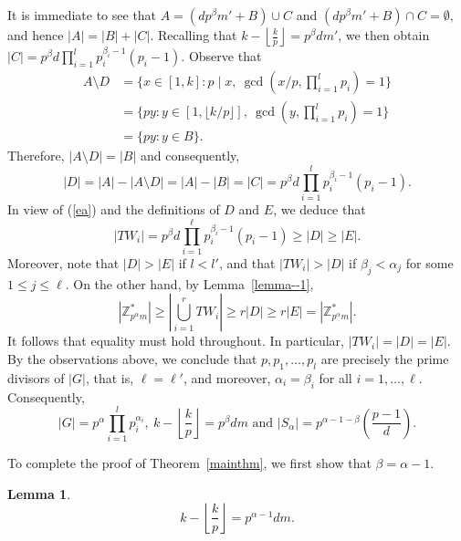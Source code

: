 \documentclass[12pt]{article}
\newtheorem{lemma}[theorem]{Lemma}
\begin{document}
It is immediate to see that $A = (d p^{\beta} m' + B) \cup C$ and $(d p^{\beta} m' + B) \cap C = \emptyset,$
and hence \(|A| = |B| + |C|\).  
Recalling that \(k - \left\lfloor \frac{k}{p} \right\rfloor = p^{\beta} d m'\), we then obtain $|C| = p^{\beta} d \prod_{i=1}^{l} p_i^{\beta_i - 1}(p_i - 1).$ Observe that
\begin{align*}
A \setminus D
&= \{x \in [1,k] : p \mid x,\ \gcd(x/p, \textstyle\prod_{i=1}^{l} p_i) = 1\} \\
&= \{p y : y \in [1,\lfloor k/p \rfloor],\ \gcd(y, \textstyle\prod_{i=1}^{l} p_i) = 1\} \\
&= \{p y : y \in B\}.
\end{align*}
Therefore, $|A \setminus D|=|B|$ and consequently, \[
|D| = |A| - |A \setminus D| = |A| - |B| = |C|
= p^{\beta} d \prod_{i=1}^{l} p_i^{\beta_i - 1}(p_i - 1).
\]
In view of (\ref{ea}) and  the definitions of $D$ and $E$, we deduce that 
\[
|T W_i| =p^{\beta}d \prod_{i=1}^{\ell} p_i^{\beta_i-1}(p_i-1) \ge |D| \ge |E|.
\]
Moreover, note that \( |D|>|E| \) if \(l<l'\), and that $|TW_i|>|D|$  if  $ \beta_j<\alpha_j$ for  some $ 1\leq j\leq \ell$. 
On the other hand, by Lemma~\ref{lemma--1},
\[
|\mathbb{Z}_{p^{\alpha} m}^{*}|
\ge \left| \bigcup_{i=1}^{r} T W_i \right|
\ge r |D|
\ge r |E|=|\mathbb{Z}_{p^{\alpha} m}^{*}|.
\]
It follows that equality must hold throughout. In particular, $|T W_i| = |D| = |E|$. 
By the observations above, we conclude that \(p,p_1,\dots,p_l\) are precisely the prime divisors of \(|G|\), that is, $\ell=\ell'$, and moreover,  
\(\alpha_i = \beta_i\) for all \(i=1,\ldots, \ell\). 
Consequently, \[
|G| = p^{\alpha} \prod_{i=1}^{l} p_i^{\alpha_i},\  k - \left\lfloor \frac{k}{p} \right\rfloor = p^{\beta} d m \mbox{ and } 
|S_\alpha| = p^{\alpha - 1 - \beta} \left(\frac{p - 1}{d}\right).
\]

To complete the proof of Theorem~\ref{mainthm}, we first show that $\beta=\alpha-1.$

\begin{lemma}
\[
k - \left\lfloor \frac{k}{p} \right\rfloor = p^{\alpha-1} d m.
\]
\end{lemma}
\end{document}
